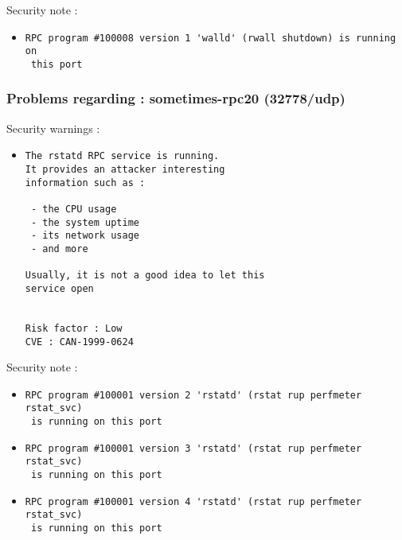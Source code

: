 \documentclass{article}
\begin{document}
Security note :\\
\begin{itemize}
\item \begin{verbatim}
RPC program #100008 version 1 'walld' (rwall shutdown) is running on
 this port
\end{verbatim}\end{itemize}
\subsubsection{Problems regarding : sometimes-rpc20 (32778/udp)}
Security warnings :\\
\begin{itemize}
\item \begin{verbatim}
The rstatd RPC service is running. 
It provides an attacker interesting
information such as :

 - the CPU usage
 - the system uptime
 - its network usage
 - and more
 
Usually, it is not a good idea to let this
service open


Risk factor : Low
CVE : CAN-1999-0624
\end{verbatim}\end{itemize}
Security note :\\
\begin{itemize}
\item \begin{verbatim}
RPC program #100001 version 2 'rstatd' (rstat rup perfmeter rstat_svc)
 is running on this port
\end{verbatim}\item \begin{verbatim}
RPC program #100001 version 3 'rstatd' (rstat rup perfmeter rstat_svc)
 is running on this port
\end{verbatim}\item \begin{verbatim}
RPC program #100001 version 4 'rstatd' (rstat rup perfmeter rstat_svc)
 is running on this port
\end{verbatim}\end{itemize}
\end{document}
